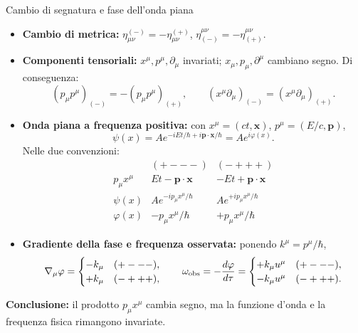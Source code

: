 \begin{frame}[t]{Cambio di segnatura e fase dell'onda piana}
\scriptsize\raggedright
\begin{itemize}
    \item \textbf{Cambio di metrica:} $\eta_{\mu\nu}^{(-)}=-\eta_{\mu\nu}^{(+)}$, $\eta^{\mu\nu}_{(-)}=-\eta^{\mu\nu}_{(+)}$.
    \item \textbf{Componenti tensoriali:}
    $x^\mu,p^\mu,\partial_\mu$ invariati;
    $x_\mu,p_\mu,\partial^\mu$ cambiano segno.
    Di conseguenza:
    \[
    (p_\mu p^\mu)_{(-)}
    =-(p_\mu p^\mu)_{(+)},
    \qquad
    (x^\mu\partial_\mu)_{(-)}
    =(x^\mu\partial_\mu)_{(+)}.
    \]
    \item \textbf{Onda piana a frequenza positiva:}
    con $x^\mu=(ct,\mathbf{x})$,
    $p^\mu=(E/c,\mathbf{p})$,
    \[
    \psi(x)=A e^{-iEt/\hbar+i\mathbf{p}\cdot\mathbf{x}/\hbar}
           =A e^{i\varphi(x)}.
    \]
    Nelle due convenzioni:
    \[
    \begin{array}{c|c|c}
      & (+---) & (-+++)\\ \hline
      p_\mu x^\mu
      & Et-\mathbf p\cdot\mathbf x
      & -Et+\mathbf p\cdot\mathbf x\\[2pt]
      \psi(x)
      & A e^{-ip_\mu x^\mu/\hbar}
      & A e^{+ip_\mu x^\mu/\hbar}\\[2pt]
      \varphi(x)
      & -p_\mu x^\mu/\hbar
      & +p_\mu x^\mu/\hbar
    \end{array}
    \]
    \item \textbf{Gradiente della fase e frequenza osservata:}
    ponendo $k^\mu=p^\mu/\hbar$,
    \[
    \nabla_\mu\varphi=
    \begin{cases}
      -k_\mu &(+---),\\
      +k_\mu &(-+++),
    \end{cases}
    \qquad
    \omega_{\rm obs}
    =-\dfrac{d\varphi}{d\tau}
    =
    \begin{cases}
      +k_\mu u^\mu &(+---),\\
      -k_\mu u^\mu &(-+++).
    \end{cases}
    \]
\end{itemize}
\textbf{Conclusione:} il prodotto $p_\mu x^\mu$ cambia
segno, ma la funzione d'onda e la frequenza fisica
rimangono invariate.
\end{frame}

